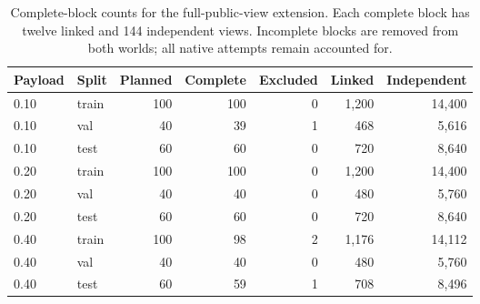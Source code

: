 \documentclass[journal]{IEEEtran}
\theoremstyle{definition}
\theoremstyle{game}
\begin{document}
\begin{table}[p]
\centering\small
\caption{Complete-block counts for the full-public-view extension. Each complete block has twelve linked and 144 independent views. Incomplete blocks are removed from both worlds; all native attempts remain accounted for.}
\label{tab:fullview-block-accounting}
\begin{tabular}{@{}llrrrrr@{}}
\toprule
Payload & Split & Planned & Complete & Excluded & Linked & Independent\\
\midrule
0.10 & train & 100 & 100 & 0 & 1,200 & 14,400\\
0.10 & val & 40 & 39 & 1 & 468 & 5,616\\
0.10 & test & 60 & 60 & 0 & 720 & 8,640\\
0.20 & train & 100 & 100 & 0 & 1,200 & 14,400\\
0.20 & val & 40 & 40 & 0 & 480 & 5,760\\
0.20 & test & 60 & 60 & 0 & 720 & 8,640\\
0.40 & train & 100 & 98 & 2 & 1,176 & 14,112\\
0.40 & val & 40 & 40 & 0 & 480 & 5,760\\
0.40 & test & 60 & 59 & 1 & 708 & 8,496\\
\bottomrule
\end{tabular}
\end{table}
\end{document}
